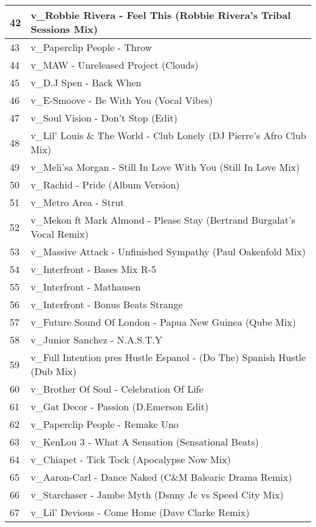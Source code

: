 \begin{appendices}
\begin{longtable}{| p{} | p{} |}
\hline
42 & v{\_}Robbie Rivera - Feel This (Robbie Rivera's Tribal Sessions Mix)\\
\hline
43 & v{\_}Paperclip People - Throw\\
\hline
44 & v{\_}MAW - Unreleased Project (Clouds)\\
\hline
45 & v{\_}D.J Spen - Back When\\
\hline
46 & v{\_}E-Smoove - Be With You (Vocal Vibes)\\
\hline
47 & v{\_}Soul Vision - Don't Stop (Edit)\\
\hline 
48 & v{\_}Lil' Louis {\&} The World - Club Lonely (DJ Pierre's Afro Club Mix)\\
\hline
49 & v{\_}Meli'sa Morgan - Still In Love With You (Still In Love Mix)\\
\hline
50 & v{\_}Rachid - Pride (Album Version)\\
\hline
51 & v{\_}Metro Area - Strut\\
\hline
52 & v{\_}Mekon ft Mark Almond - Please Stay (Bertrand Burgalat's Vocal Remix)\\
\hline
53 & v{\_}Massive Attack - Unfinished Sympathy (Paul Oakenfold Mix)\\
\hline
54 & v{\_}Interfront - Bases Mix R-5\\
\hline
55 & v{\_}Interfront - Mathausen\\
\hline 
56 & v{\_}Interfront - Bonus Beats Strange\\
\hline
57 & v{\_}Future Sound Of London - Papua New Guinea (Qube Mix)\\
\hline 
58 & v{\_}Junior Sanchez - N.A.S.T.Y\\
\hline
59 & v{\_}Full Intention pres Hustle Espanol - (Do The) Spanish Hustle (Dub Mix)\\
\hline
60 & v{\_}Brother Of Soul - Celebration Of Life\\
\hline
61 & v{\_}Gat Decor - Passion (D.Emerson Edit)\\
\hline 
62 & v{\_}Paperclip People - Remake Uno\\
\hline 
63 & v{\_}KenLou 3 - What A Sensation (Sensational Beats)\\
\hline
64 & v{\_}Chiapet - Tick Tock (Apocalypse Now Mix)\\
\hline
65 & v{\_}Aaron-Carl - Dance Naked (C{\&}M Balearic Drama Remix)\\
\hline
66 & v{\_}Starchaser - Jambe Myth (Dsnny Jc vs Speed City Mix)\\
\hline
67 & v{\_}Lil' Devious - Come Home (Dave Clarke Remix)\\

\end{longtable}
\end{appendices}
